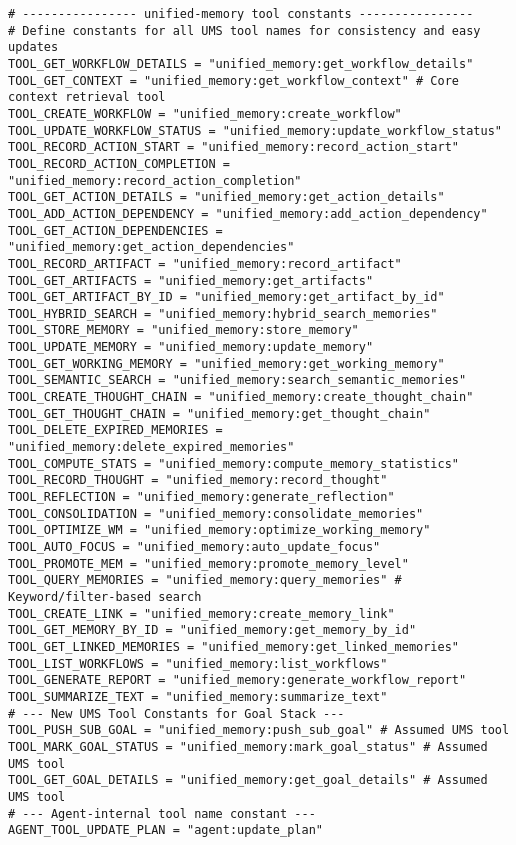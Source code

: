 \documentclass[12pt,a4paper]{article}
\begin{document}
\begin{pageablecode}
\begin{verbatim}
# ---------------- unified‑memory tool constants ----------------
# Define constants for all UMS tool names for consistency and easy updates
TOOL_GET_WORKFLOW_DETAILS = "unified_memory:get_workflow_details"
TOOL_GET_CONTEXT = "unified_memory:get_workflow_context" # Core context retrieval tool
TOOL_CREATE_WORKFLOW = "unified_memory:create_workflow"
TOOL_UPDATE_WORKFLOW_STATUS = "unified_memory:update_workflow_status"
TOOL_RECORD_ACTION_START = "unified_memory:record_action_start"
TOOL_RECORD_ACTION_COMPLETION = "unified_memory:record_action_completion"
TOOL_GET_ACTION_DETAILS = "unified_memory:get_action_details"
TOOL_ADD_ACTION_DEPENDENCY = "unified_memory:add_action_dependency"
TOOL_GET_ACTION_DEPENDENCIES = "unified_memory:get_action_dependencies"
TOOL_RECORD_ARTIFACT = "unified_memory:record_artifact"
TOOL_GET_ARTIFACTS = "unified_memory:get_artifacts"
TOOL_GET_ARTIFACT_BY_ID = "unified_memory:get_artifact_by_id"
TOOL_HYBRID_SEARCH = "unified_memory:hybrid_search_memories"
TOOL_STORE_MEMORY = "unified_memory:store_memory"
TOOL_UPDATE_MEMORY = "unified_memory:update_memory"
TOOL_GET_WORKING_MEMORY = "unified_memory:get_working_memory"
TOOL_SEMANTIC_SEARCH = "unified_memory:search_semantic_memories"
TOOL_CREATE_THOUGHT_CHAIN = "unified_memory:create_thought_chain"
TOOL_GET_THOUGHT_CHAIN = "unified_memory:get_thought_chain"
TOOL_DELETE_EXPIRED_MEMORIES = "unified_memory:delete_expired_memories"
TOOL_COMPUTE_STATS = "unified_memory:compute_memory_statistics"
TOOL_RECORD_THOUGHT = "unified_memory:record_thought"
TOOL_REFLECTION = "unified_memory:generate_reflection"
TOOL_CONSOLIDATION = "unified_memory:consolidate_memories"
TOOL_OPTIMIZE_WM = "unified_memory:optimize_working_memory"
TOOL_AUTO_FOCUS = "unified_memory:auto_update_focus"
TOOL_PROMOTE_MEM = "unified_memory:promote_memory_level"
TOOL_QUERY_MEMORIES = "unified_memory:query_memories" # Keyword/filter-based search
TOOL_CREATE_LINK = "unified_memory:create_memory_link"
TOOL_GET_MEMORY_BY_ID = "unified_memory:get_memory_by_id"
TOOL_GET_LINKED_MEMORIES = "unified_memory:get_linked_memories"
TOOL_LIST_WORKFLOWS = "unified_memory:list_workflows"
TOOL_GENERATE_REPORT = "unified_memory:generate_workflow_report"
TOOL_SUMMARIZE_TEXT = "unified_memory:summarize_text"
# --- New UMS Tool Constants for Goal Stack ---
TOOL_PUSH_SUB_GOAL = "unified_memory:push_sub_goal" # Assumed UMS tool
TOOL_MARK_GOAL_STATUS = "unified_memory:mark_goal_status" # Assumed UMS tool
TOOL_GET_GOAL_DETAILS = "unified_memory:get_goal_details" # Assumed UMS tool
# --- Agent-internal tool name constant ---
AGENT_TOOL_UPDATE_PLAN = "agent:update_plan"


\end{verbatim}
\end{pageablecode}
\end{document}
